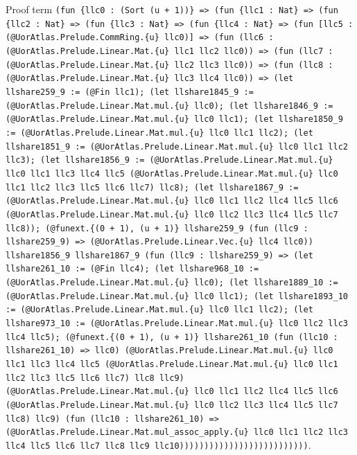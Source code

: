 \documentclass[11pt]{article}
\begin{document}
\noindent Proof term \texttt{(fun \{llc0 : (Sort (u + 1))\} => (fun \{llc1 : Nat\} => (fun \{llc2 : Nat\} => (fun \{llc3 : Nat\} => (fun \{llc4 : Nat\} => (fun [llc5 : (@UorAtlas.Prelude.CommRing.\{u\} llc0)] => (fun (llc6 : (@UorAtlas.Prelude.Linear.Mat.\{u\} llc1 llc2 llc0)) => (fun (llc7 : (@UorAtlas.Prelude.Linear.Mat.\{u\} llc2 llc3 llc0)) => (fun (llc8 : (@UorAtlas.Prelude.Linear.Mat.\{u\} llc3 llc4 llc0)) => (let llshare259\_9 := (@Fin llc1); (let llshare1845\_9 := (@UorAtlas.Prelude.Linear.Mat.mul.\{u\} llc0); (let llshare1846\_9 := (@UorAtlas.Prelude.Linear.Mat.mul.\{u\} llc0 llc1); (let llshare1850\_9 := (@UorAtlas.Prelude.Linear.Mat.mul.\{u\} llc0 llc1 llc2); (let llshare1851\_9 := (@UorAtlas.Prelude.Linear.Mat.mul.\{u\} llc0 llc1 llc2 llc3); (let llshare1856\_9 := (@UorAtlas.Prelude.Linear.Mat.mul.\{u\} llc0 llc1 llc3 llc4 llc5 (@UorAtlas.Prelude.Linear.Mat.mul.\{u\} llc0 llc1 llc2 llc3 llc5 llc6 llc7) llc8); (let llshare1867\_9 := (@UorAtlas.Prelude.Linear.Mat.mul.\{u\} llc0 llc1 llc2 llc4 llc5 llc6 (@UorAtlas.Prelude.Linear.Mat.mul.\{u\} llc0 llc2 llc3 llc4 llc5 llc7 llc8)); (@funext.\{(0 + 1), (u + 1)\} llshare259\_9 (fun (llc9 : llshare259\_9) => (@UorAtlas.Prelude.Linear.Vec.\{u\} llc4 llc0)) llshare1856\_9 llshare1867\_9 (fun (llc9 : llshare259\_9) => (let llshare261\_10 := (@Fin llc4); (let llshare968\_10 := (@UorAtlas.Prelude.Linear.Mat.mul.\{u\} llc0); (let llshare1889\_10 := (@UorAtlas.Prelude.Linear.Mat.mul.\{u\} llc0 llc1); (let llshare1893\_10 := (@UorAtlas.Prelude.Linear.Mat.mul.\{u\} llc0 llc1 llc2); (let llshare973\_10 := (@UorAtlas.Prelude.Linear.Mat.mul.\{u\} llc0 llc2 llc3 llc4 llc5); (@funext.\{(0 + 1), (u + 1)\} llshare261\_10 (fun (llc10 : llshare261\_10) => llc0) (@UorAtlas.Prelude.Linear.Mat.mul.\{u\} llc0 llc1 llc3 llc4 llc5 (@UorAtlas.Prelude.Linear.Mat.mul.\{u\} llc0 llc1 llc2 llc3 llc5 llc6 llc7) llc8 llc9) (@UorAtlas.Prelude.Linear.Mat.mul.\{u\} llc0 llc1 llc2 llc4 llc5 llc6 (@UorAtlas.Prelude.Linear.Mat.mul.\{u\} llc0 llc2 llc3 llc4 llc5 llc7 llc8) llc9) (fun (llc10 : llshare261\_10) => (@UorAtlas.Prelude.Linear.Mat.mul\_assoc\_apply.\{u\} llc0 llc1 llc2 llc3 llc4 llc5 llc6 llc7 llc8 llc9 llc10))))))))))))))))))))))))))}.\par
\end{document}
